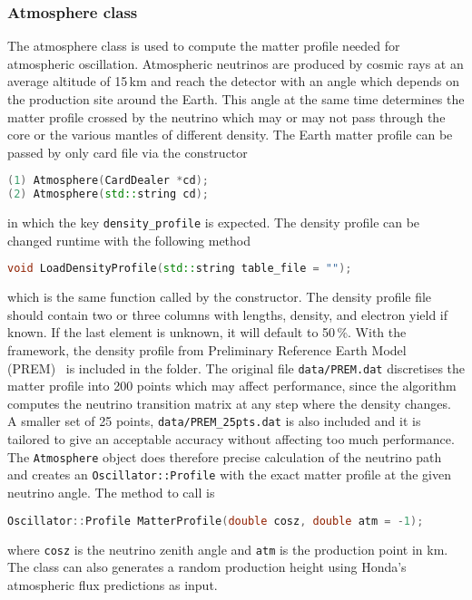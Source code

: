 \documentclass[a4paper, 11pt]{article}
\begin{document}
\subsubsection{Atmosphere class}
\label{sec:atmosphere}

The atmosphere class is used to compute the matter profile needed for atmospheric oscillation.
Atmospheric neutrinos are produced by cosmic rays at an average altitude of 15\,km and reach the detector with an angle which depends %
on the production site around the Earth.
This angle at the same time determines the matter profile crossed by the neutrino which may or may not pass through the core or the various mantles %
of different density.
The Earth matter profile can be passed by only card file via the constructor
\begin{lstlisting}[language=C++]
(1) Atmosphere(CardDealer *cd);
(2) Atmosphere(std::string cd);
\end{lstlisting}
in which the key \texttt{density\_profile} is expected.
The density profile can be changed runtime with the following method 
\begin{lstlisting}[language=C++]
    void LoadDensityProfile(std::string table_file = "");
\end{lstlisting}
which is the same function called by the constructor.
The density profile file should contain two or three columns with lengths, density, and electron yield if known.
If the last element is unknown, it will default to 50\,\%.
With the framework, the density profile from Preliminary Reference Earth Model (PREM)~\cite{Dziewonski:1981xy} is included in the  folder.
The original file \texttt{data/PREM.dat} discretises the matter profile into 200 points which may affect performance, %
since the algorithm computes the neutrino transition matrix at any step where the density changes.
A smaller set of 25 points, \texttt{data/PREM\_25pts.dat} is also included and it is tailored to give an acceptable accuracy without affecting too much performance.
The \texttt{Atmosphere} object does therefore precise calculation of the neutrino path and creates an \texttt{Oscillator::Profile} %
with the exact matter profile at the given neutrino angle.
The method to call is
\begin{lstlisting}[language=C++]
    Oscillator::Profile MatterProfile(double cosz, double atm = -1);
\end{lstlisting}
where \texttt{cosz} is the neutrino zenith angle and \texttt{atm} is the production point in km.
The class can also generates a random production height using Honda's atmospheric flux predictions as input.
\end{document}
